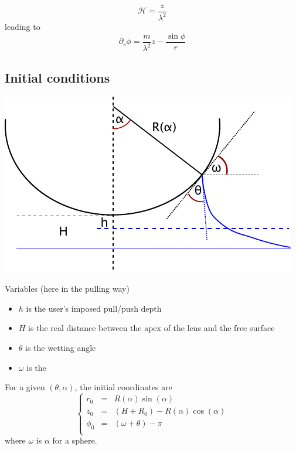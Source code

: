 \documentclass[aps,onecolumn]{revtex4}
\begin{document}
\begin{equation}
	\mathcal{H} = \dfrac{z}{\lambda^2}
\end{equation}
leading to
\begin{equation}
	\partial_s \phi = \dfrac{m}{\lambda^2} z  - \dfrac{\sin\phi}{r}
\end{equation}


\subsection{Initial conditions}

\begin{center}
\includegraphics{pull.pdf}
\end{center}

Variables (here in the pulling way)
\begin{itemize}
	\item $h$ is the user's imposed pull/push depth
	\item $H$ is the real distance between the apex of the lens and the free surface
	\item $\theta$ is the wetting angle
	\item $\omega$ is the 
\end{itemize}

For a given $(\theta,\alpha)$, the initial coordinates are
\begin{equation}
\left\lbrace
\begin{array}{rcl}
	r_0    & = & R(\alpha) \sin(\alpha)\\
	z_0    & = & (H + R_0) - R(\alpha) \cos(\alpha)\\
	\phi_0 & = & \left(\omega + \theta\right) - \pi\\
\end{array}
\right. 
\end{equation}
where $\omega$ is $\alpha$ for a sphere.\\
\end{document}
